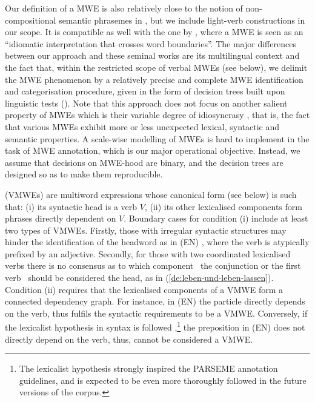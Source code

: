 \documentclass[output=paper,
modfonts,
]{langscibook}
\begin{document}
Our definition of a MWE is also relatively close to the notion of non-com\-po\-si\-tio\-nal semantic phrasemes in \citet{Melcuk10}, but we include light-verb constructions in our scope. It is compatible as well with the one by \citet{Sag2002a}, where a MWE is seen as an ``idiomatic interpretation that crosses word boundaries''. The major differences between our approach and these seminal works are its multilingual context and the fact that, within the restricted scope of verbal MWEs (see below), we delimit the MWE phenomenon by a relatively precise and complete MWE identification and categorisation procedure, given in the form of decision trees built upon linguistic tests (). Note that this approach does not focus on another salient property of MWEs which is their variable degree of idiosyncrasy \citep{GastonGross88}, that is, the fact that various MWEs exhibit more or less unexpected lexical, syntactic and semantic properties. A scale-wise modelling of MWEs is hard to implement in the task of MWE annotation, which is our major operational objective. Instead, we assume that decisions on MWE-hood are binary, and the decision trees are designed so as to make them reproducible. 

 (VMWEs) are multiword expressions whose canonical form (see below) is such that: (i) its syntactic head is a verb $V$, (ii) its other lexicalised components form phrases directly dependent on $V$. Boundary cases for condition (i) include at least two types of VMWEs. Firstly, those with irregular syntactic structures may hinder the identification of the headword as in (EN) , where the verb is atypically prefixed by an adjective. Secondly, for those with two coordinated lexicalised verbs there is no consensus as to which component \textendash~the conjunction or the first verb \textendash~should be considered the head, as in (\ref{de:leben-und-leben-lassen}).
Condition (ii) requires that the lexicalised components of a VMWE form a connected dependency graph. For instance, in (EN)  the particle  directly depends on the verb, thus  fulfils the syntactic requirements to be a VMWE. Conversely, if the lexicalist hypothesis in syntax is followed \citep{de2014universal},\footnote{The lexicalist hypothesis strongly inspired the PARSEME annotation guidelines, and is expected to be even more thoroughly followed in the future versions of the corpus.} the preposition  in (EN)  does not directly depend on the verb, thus,  cannot be considered a VMWE.
\end{document}
